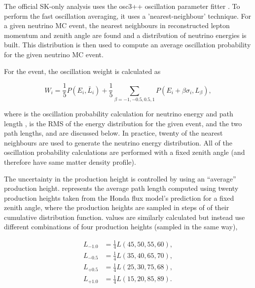 The official SK-only analysis uses the osc3++ oscillation parameter fitter \cite{thesis_roger}. To perform the fast oscillation averaging, it uses a 'nearest-neighbour' technique. For a given neutrino MC event, the nearest neighbours in reconstructed lepton momentum and zenith angle are found and a distribution of neutrino energies is built. This distribution is then used to compute an average oscillation probability for the given neutrino MC event. 

For the  event, the oscillation weight is calculated as

\begin{equation}
  W_{i} = \frac{1}{5} P(E_{i},\bar{L}_{i}) + \frac{1}{5} \sum_{\beta = -1, -0.5, 0.5, 1} P(E_{i} + \beta\sigma_{i},L_{\beta}),
\end{equation}

where  is the oscillation probability calculation for neutrino energy  and path length ,  is the RMS of the energy distribution for the given event, and the two path lengths,  and  are discussed below. In practice, twenty of the nearest neighbours are used to generate the neutrino energy distribution. All of the oscillation probability calculations are performed with a fixed zenith angle (and therefore have same matter density profile).

The uncertainty in the production height is controlled by using an ``average'' production height.  represents the average path length computed using twenty production heights taken from the Honda flux model's prediction  for a fixed zenith angle, where the production heights are sampled in steps of  of their cumulative distribution function.  values are similarly calculated but instead use different combinations of four production heights (sampled in the same way),

\begin{equation}
  \begin{split}
    L_{-1.0} &= \frac{1}{4} L(45,50,55,60), \\
    L_{-0.5} &= \frac{1}{4} L(35,40,65,70), \\
    L_{+0.5} &= \frac{1}{4} L(25,30,75,68), \\
    L_{+1.0} &= \frac{1}{4} L(15,20,85,89). \\
  \end{split}
\end{equation}

